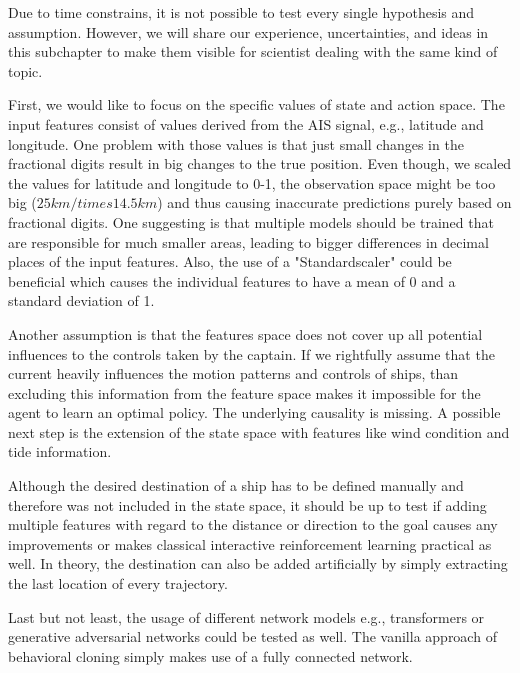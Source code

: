Due to time constrains, it is not possible to test every single hypothesis and assumption. However, we will share our experience, uncertainties, and ideas in this subchapter to make them visible for scientist dealing with the same kind of topic.
\par
First, we would like to focus on the specific values of state and action space. The input features consist of values derived from the AIS signal, e.g., latitude and longitude. One problem with those values is that just small changes in the fractional digits result in big changes to the true position. Even though, we scaled the values for latitude and longitude to 0-1, the observation space might be too big ($25km /times 14.5km$) and thus causing inaccurate predictions purely based on fractional digits. One suggesting is that multiple models should be trained that are responsible for much smaller areas, leading to bigger differences in decimal places of the input features. Also, the use of a "Standardscaler" could be beneficial which causes the individual features to have a mean of 0 and a standard deviation of 1.
\par
Another assumption is that the features space does not cover up all potential influences to the controls taken by the captain. If we rightfully assume that the current heavily influences the motion patterns and controls of ships, than excluding this information from the feature space makes it impossible for the agent to learn an optimal policy. The underlying causality is missing. A possible next step is the extension of the state space with features like wind condition and tide information.
\par
Although the desired destination of a ship has to be defined manually and therefore was not included in the state space, it should be up to test if adding multiple features with regard to the distance or direction to the goal causes any improvements or makes classical interactive reinforcement learning practical as well. In theory, the destination can also be added artificially by simply extracting the last location of every trajectory.
\par
Last but not least, the usage of different network models e.g., transformers or generative adversarial networks could be tested as well. The vanilla approach of behavioral cloning simply makes use of a fully connected network.